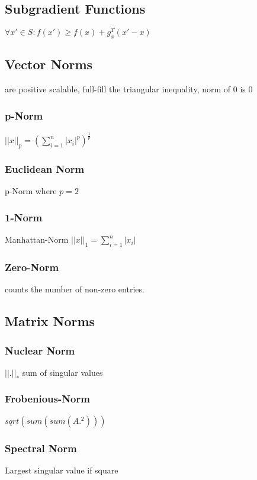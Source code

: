\documentclass[a4paper,11pt,twocolumn]{article}
\begin{document}
\subsection{Subgradient Functions}
$\forall x' \in S : f(x') \geq f(x) + g_x^T(x'-x)$

\subsection{Vector Norms}
are positive scalable, full-fill the triangular inequality, norm of 0 is 0

\subsubsection{p-Norm}
$ || x ||_p = \left( \sum_{i=1}^{n}{|x_i|^p} \right)^{\frac{1}{p}}$

\subsubsection{Euclidean Norm} 
p-Norm where $p=2$

\subsubsection{1-Norm}
Manhattan-Norm
$ ||x||_1 = \sum_{i=1}^{n}{|x_i|} $

\subsubsection{Zero-Norm} 
counts the number of non-zero entries.

\subsection{Matrix Norms}

\subsubsection{Nuclear Norm}

$|| . ||_*$ sum of singular values

\subsubsection{Frobenious-Norm}
$sqrt(sum(sum(A.^2)))$

\subsubsection{Spectral Norm} 
Largest singular value if square 
\end{document}

